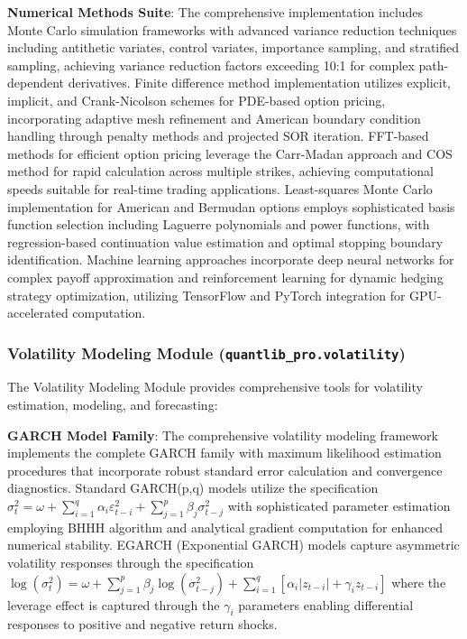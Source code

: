 \documentclass[12pt,a4paper]{article}
\theoremstyle{definition}
\theoremstyle{remark}
\begin{document}
\textbf{Numerical Methods Suite}: The comprehensive implementation includes Monte Carlo simulation frameworks with advanced variance reduction techniques including antithetic variates, control variates, importance sampling, and stratified sampling, achieving variance reduction factors exceeding 10:1 for complex path-dependent derivatives. Finite difference method implementation utilizes explicit, implicit, and Crank-Nicolson schemes for PDE-based option pricing, incorporating adaptive mesh refinement and American boundary condition handling through penalty methods and projected SOR iteration. FFT-based methods for efficient option pricing leverage the Carr-Madan approach and COS method for rapid calculation across multiple strikes, achieving computational speeds suitable for real-time trading applications. Least-squares Monte Carlo implementation for American and Bermudan options employs sophisticated basis function selection including Laguerre polynomials and power functions, with regression-based continuation value estimation and optimal stopping boundary identification. Machine learning approaches incorporate deep neural networks for complex payoff approximation and reinforcement learning for dynamic hedging strategy optimization, utilizing TensorFlow and PyTorch integration for GPU-accelerated computation.

\subsubsection{Volatility Modeling Module (\texttt{quantlib\_pro.volatility})}

The Volatility Modeling Module provides comprehensive tools for volatility estimation, modeling, and forecasting:

\textbf{GARCH Model Family}: The comprehensive volatility modeling framework implements the complete GARCH family with maximum likelihood estimation procedures \citep{bollerslev1986garch, engle1982arch} that incorporate robust standard error calculation and convergence diagnostics. Standard GARCH(p,q) models utilize the specification $\sigma_t^2 = \omega + \sum_{i=1}^q \alpha_i \varepsilon_{t-i}^2 + \sum_{j=1}^p \beta_j \sigma_{t-j}^2$ with sophisticated parameter estimation employing BHHH algorithm and analytical gradient computation for enhanced numerical stability. EGARCH (Exponential GARCH) models capture asymmetric volatility responses through the specification $\log(\sigma_t^2) = \omega + \sum_{j=1}^p \beta_j \log(\sigma_{t-j}^2) + \sum_{i=1}^q [\alpha_i |z_{t-i}| + \gamma_i z_{t-i}]$ where the leverage effect is captured through the $\gamma_i$ parameters enabling differential responses to positive and negative return shocks.
\end{document}
